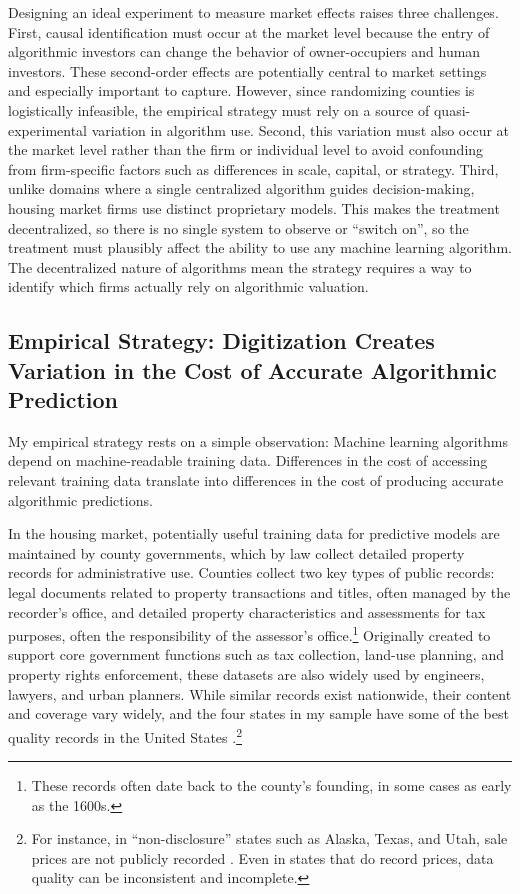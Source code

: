 \documentclass[11pt]{article}
\begin{document}
Designing an ideal experiment to measure market effects raises three challenges. First, causal identification must occur at the market level because the entry of algorithmic investors can change the behavior of owner-occupiers and human investors. These second-order effects are potentially central to market settings and especially important to capture. However, since randomizing counties is logistically infeasible, the empirical strategy must rely on a source of quasi-experimental variation in algorithm use. Second, this variation must also occur at the market level rather than the firm or individual level to avoid confounding from firm-specific factors such as differences in scale, capital, or strategy. Third, unlike domains where a single centralized algorithm guides decision-making, housing market firms use distinct proprietary models. This makes the treatment decentralized, so there is no single system to observe or ``switch on'', so the treatment must plausibly affect the ability to use any machine learning algorithm. The decentralized nature of algorithms mean the strategy requires a way to identify which firms actually rely on algorithmic valuation.



\subsection{Empirical Strategy: Digitization Creates Variation in the Cost of Accurate Algorithmic Prediction}
My empirical strategy rests on a simple observation: Machine learning algorithms depend on machine-readable training data. Differences in the cost of accessing relevant training data translate into differences in the cost of producing accurate algorithmic predictions.

In the housing market, potentially useful training data for predictive models are maintained by county governments, which by law collect detailed property records for administrative use. Counties collect two key types of public records: legal documents related to property transactions and titles, often managed by the recorder’s office, and detailed property characteristics and assessments for tax purposes, often the responsibility of the assessor’s office.\footnote{These records often date back to the county’s founding, in some cases as early as the 1600s.} Originally created to support core government functions such as tax collection, land-use planning, and property rights enforcement, these datasets are also widely used by engineers, lawyers, and urban planners. While similar records exist nationwide, their content and coverage vary widely, and the four states in my sample have some of the best quality records in the United States \citep{nolte_studying_2021}.\footnote{For instance, in ``non-disclosure'' states such as Alaska, Texas, and Utah, sale prices are not publicly recorded \citep{berrens2004}. Even in states that do record prices, data quality can be inconsistent and incomplete.}
\end{document}

